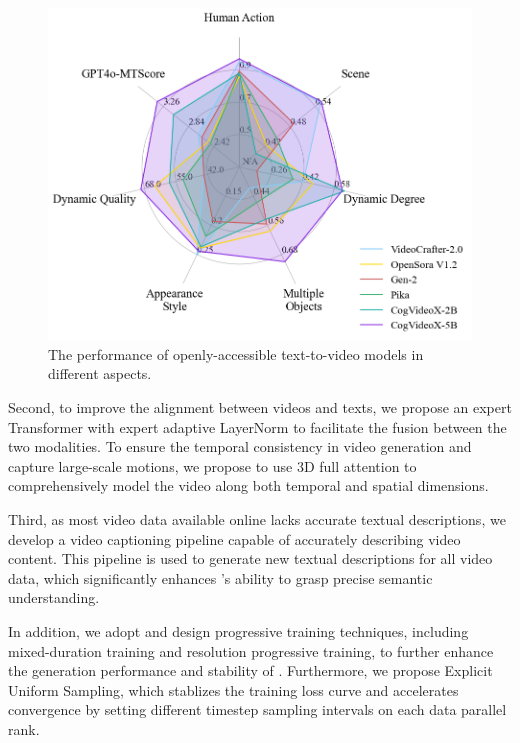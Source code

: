 
\begin{figure}
\centering
\includegraphics[width=0.7\linewidth]{images/bench_eval9.png}
\caption{The performance of openly-accessible text-to-video models in different aspects.}
\label{fig:radar}

\end{figure}



Second, to improve the alignment between videos and texts, we propose an expert Transformer with  expert adaptive LayerNorm to facilitate the fusion between the two modalities. 
To ensure the temporal consistency in video generation and  capture large-scale motions, we propose to use 3D full attention to comprehensively model the video along both temporal and spatial dimensions. 

Third, as most video data available online lacks accurate textual descriptions, we develop a video captioning pipeline capable of accurately describing video content. 
This pipeline is used to generate new textual descriptions for all video data, which significantly enhances \model's ability to grasp precise semantic understanding. 

In addition, we adopt and design progressive training techniques, including mixed-duration training and resolution progressive training, to further enhance the generation performance and stability of \model. Furthermore, we propose Explicit Uniform Sampling, which stablizes the training loss curve and accelerates convergence by setting different timestep sampling intervals on each data parallel rank.

